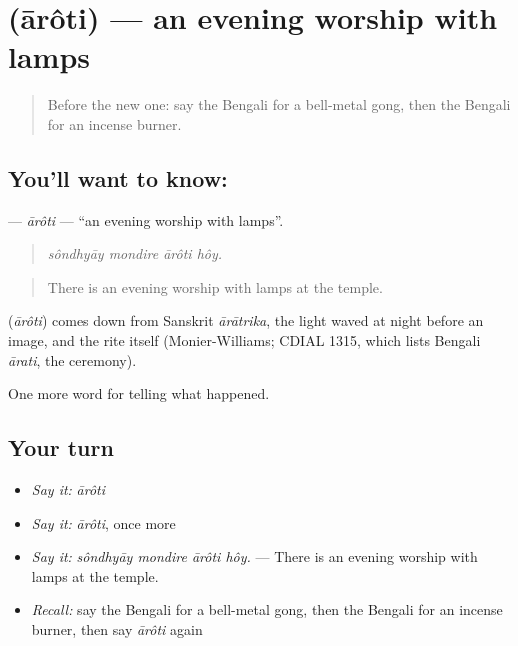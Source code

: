 \section[\texorpdfstring{\bn{আরতি} (ārôti)}{আরতি (ārôti)}]{ (ārôti) — an evening worship with lamps}

\label{lesson:BN-C307-aroti}



\begin{quote}
Before the new one: say the Bengali for a bell-metal gong, then the Bengali for an incense burner.
\end{quote}

\subsection*{You'll want to know: }
\textbf{} — \emph{ārôti} — \textquotedblleft{}an evening worship with lamps\textquotedblright{}.

\begin{quote}
   
\end{quote}

\begin{quote}
\emph{sôndhyāy mondire ārôti hôy.}
\end{quote}

\begin{quote}
There is an evening worship with lamps at the temple.
\end{quote}

\begin{cousinweb}
\textbf{} (\emph{ārôti}) comes down from Sanskrit \emph{ārātrika}, the light waved at night before an image, and the rite itself (Monier-Williams; CDIAL 1315, which lists Bengali \emph{ārati}, the ceremony).
\end{cousinweb}

\begin{grammarlens}[title={What you've built}]
One more word for telling what happened.
\end{grammarlens}

\subsection*{Your turn}
\begin{itemize}
\raggedright
  \item \emph{Say it:} \emph{ārôti}
  \item \emph{Say it:} \emph{ārôti}, once more
  \item \emph{Say it:} \emph{sôndhyāy mondire ārôti hôy.} — There is an evening worship with lamps at the temple.
  \item \emph{Recall:} say the Bengali for a bell-metal gong, then the Bengali for an incense burner, then say \emph{ārôti} again
\end{itemize}

